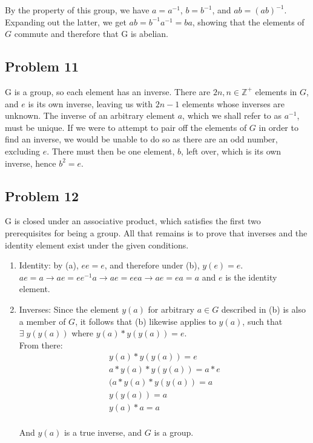 \documentclass{article}
\begin{document}
    By the property of this group, we have \(a = a^{-1}\), \(b = b^{-1}\), and
    \(ab = (ab)^{-1}\). Expanding out the latter, we get \(ab = b^{-1}a^{-1} = ba\),
    showing that the elements of \(G\) commute and therefore that G is abelian.

    \subsection*{Problem 11}
        G is a group, so each element has an inverse. There are \(2n, n \in \mathbb{Z}^+\)
        elements in \(G\), and \(e\) is its own inverse, leaving us with \(2n-1\)
        elements whose inverses are unknown. The inverse of an arbitrary element \(a\),
        which we shall refer to as \(a^{-1}\), must be unique. If we were to attempt to
        pair off the elements of \(G\) in order to find an inverse, we would be unable
        to do so as there are an odd number, excluding \(e\). There must then be one
        element, \(b\), left over, which is its own inverse, hence \(b^2 = e\).

    \subsection*{Problem 12}
        G is closed under an associative product, which satisfies the first two
        prerequisites for being a group. All that remains is to prove that inverses
        and the identity element exist under the given conditions.

        \begin{enumerate}
            \item Identity: by (a), \(ee = e\), and therefore under (b), \(y(e) = e\). \\
                \(ae = a \rightarrow ae = ee^{-1}a \rightarrow ae = eea \rightarrow
                  ae = ea = a\) and \(e\) is the identity element.
            \item Inverses: Since the element \(y(a)\) for arbitrary \(a \in G\) described
                in (b) is also a member of \(G\), it follows that (b) likewise applies
                to \(y(a)\), such that \(\exists \; y(y(a))\) where \(y(a) * y(y(a)) = e\).\\
                From there:
                \begin{align*}
                    y(a) * y(y(a)) = e \\
                    a * y(a) * y(y(a)) = a * e \\
                    (a * y(a) * y(y(a)) = a \\
                    y(y(a)) = a \\
                    y(a) * a = a \\
                \end{align*}

                And \(y(a)\) is a true inverse, and \(G\) is a group.
        \end{enumerate}
\end{document}
